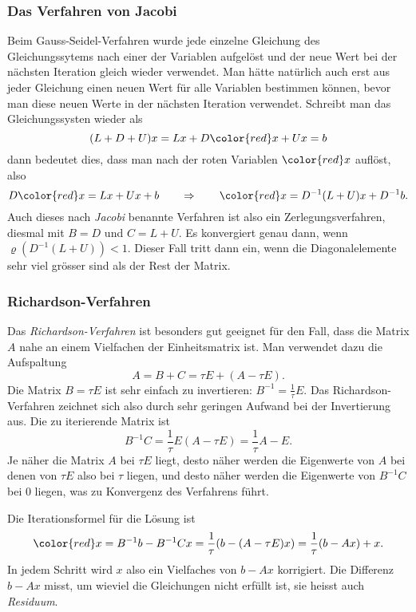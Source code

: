 \subsubsection{Das Verfahren von Jacobi}
%
Beim Gauss-Seidel-Verfahren wurde jede einzelne Gleichung des
Gleichungssytems nach einer der Variablen aufgelöst und der neue
Wert bei der nächsten Iteration gleich wieder verwendet.
Man hätte natürlich auch erst aus jeder Gleichung einen neuen
Wert für alle Variablen bestimmen können, bevor man diese neuen
Werte in der nächsten Iteration verwendet.
Schreibt man das Gleichungssysten wieder als
\[
(L+D+U) x
=
Lx + D {\color{red}x} + Ux
=
b
\]
dann bedeutet dies, dass man  nach der roten Variablen ${\color{red}x}$
auflöst, also
\[
D{\color{red}x}
=
Lx + Ux + b
\qquad\Rightarrow\qquad
{\color{red}x}
=
D^{-1}(L+U)x + D^{-1}b.
\]
Auch dieses nach {\em Jacobi} benannte Verfahren ist also ein
Zerlegungsverfahren, diesmal mit $B=D$ und $C=L+U$.
Es konvergiert genau dann, wenn $\varrho(D^{-1}(L+U))<1$.
Dieser Fall tritt dann ein, wenn die Diagonalelemente  sehr viel grösser
sind als der Rest der Matrix.

\subsubsection{Richardson-Verfahren}
%
Das {\em Richardson-Verfahren} ist besonders gut geeignet für den
Fall, dass die Matrix $A$ nahe an einem Vielfachen der Einheitsmatrix
ist.
%
Man verwendet dazu die Aufspaltung
\[
A = B + C = \tau E  + (A - \tau E).
\]
Die Matrix $B=\tau E$ ist sehr einfach zu invertieren: $B^{-1}=\frac1\tau E$.
Das Richardson-Verfahren zeichnet sich also durch sehr geringen Aufwand
bei der Invertierung aus.
Die zu iterierende Matrix ist 
\[
B^{-1}C
=
\frac{1}{\tau}E(A-\tau E)
=
\frac1\tau A  - E.
\]
Je näher die Matrix $A$ bei $\tau E$ liegt, desto näher werden die 
Eigenwerte von $A$ bei denen von $\tau E$ also bei $\tau$ liegen,
und desto näher werden die Eigenwerte von $B^{-1}C$ bei $0$ liegen,
was zu Konvergenz des Verfahrens führt.

Die Iterationsformel für die Lösung ist
%
\begin{equation}
{\color{red}x}
=
B^{-1}b - B^{-1}Cx
=
\frac1\tau ( b - (A-\tau E)x)
=
\frac1\tau (b-Ax) + x.
\label{buch:richardson-iteration}
\end{equation}
In jedem Schritt wird $x$ also ein Vielfaches von $b-Ax$ korrigiert.
Die Differenz $b-Ax$ misst, um wieviel die Gleichungen nicht 
erfüllt ist, sie heisst auch {\em Residuum}.
%

